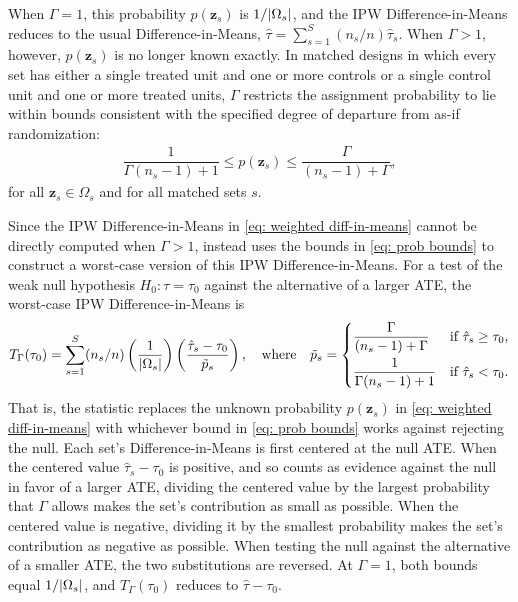 \documentclass[twoside,11pt]{article}
\DeclarePairedDelimiter\abs{\lvert}{\rvert}
\begin{document}
When \(\Gamma = 1\), this probability \(p(\bm{z}_s)\) is
\(1/\abs{\Omega_s}\), and the IPW Difference-in-Means reduces to the
usual Difference-in-Means, \(\hat{\tau} = \sum_{s=1}^S (n_s/n)\hat{\tau}_s\). When
\(\Gamma > 1\), however, \(p(\bm{z}_s)\) is no longer known exactly. In
matched designs in which every set has either a single treated unit and
one or more controls or a single control unit and one or more treated
units, \(\Gamma\) restricts the assignment probability to lie
within bounds consistent with the specified degree of departure from
as-if randomization: \begin{align} \label{eq: prob bounds}
\dfrac{1}{\Gamma (n_s - 1) + 1} \leq p(\bm{z}_s) \leq \dfrac{\Gamma}{(n_s - 1) + \Gamma},
\end{align} for all \(\bm{z}_s \in \Omega_s\) and for all matched sets
\(s\).

Since the IPW Difference-in-Means in \eqref{eq: weighted diff-in-means}
cannot be directly computed when \(\Gamma > 1\), \citet{fogarty2023}
instead uses the bounds in \eqref{eq: prob bounds} to construct a
worst-case version of this IPW Difference-in-Means. For a test of the weak
null hypothesis \(H_0\colon \tau = \tau_0\) against the alternative of a
larger ATE, the worst-case IPW Difference-in-Means is
\begin{align} \label{eq: worst-case IPW}
T_{\Gamma}(\tau_0) = \sum \limits_{s = 1}^S (n_s/n) \left(\frac{1}{\abs{\Omega_s}}\right)\left(\frac{\hat{\tau}_s - \tau_0}{\tilde{p}_s}\right),
\quad \text{where} \quad
\tilde{p}_s =
\begin{cases}
\dfrac{\Gamma}{(n_s - 1) + \Gamma} & \text{if } \hat{\tau}_s \geq \tau_0, \\[2ex]
\dfrac{1}{\Gamma (n_s - 1) + 1} & \text{if } \hat{\tau}_s < \tau_0.
\end{cases}
\end{align}
That is, the statistic replaces the unknown probability \(p(\bm{z}_s)\) in
\eqref{eq: weighted diff-in-means} with whichever bound in
\eqref{eq: prob bounds} works against rejecting the null. Each set's
Difference-in-Means is first centered at the null ATE. When the centered
value \(\hat{\tau}_s - \tau_0\) is positive, and so counts as evidence against the null in favor of a larger ATE, dividing the centered value by the largest probability that \(\Gamma\)
allows makes the set's contribution as small as possible. When the
centered value is negative, dividing it by the smallest probability makes
the set's contribution as negative as possible. When testing the null
against the alternative of a smaller ATE, the two substitutions are
reversed. At \(\Gamma = 1\), both bounds equal \(1/\abs{\Omega_s}\), and
\(T_{\Gamma}(\tau_0)\) reduces to \(\hat{\tau} - \tau_0\).
\end{document}
